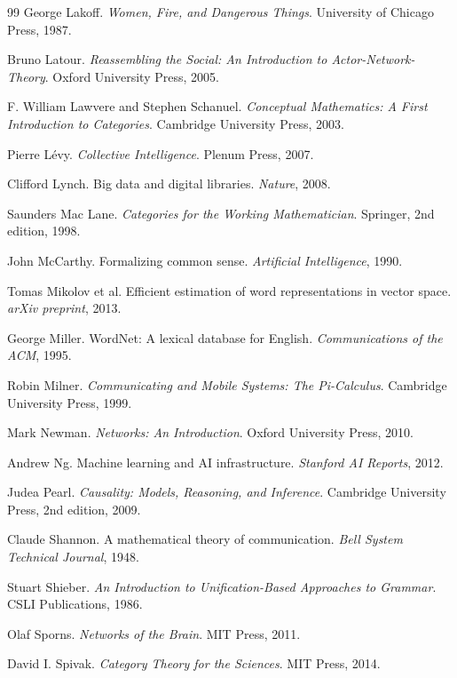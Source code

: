 \documentclass[12pt,a4paper]{article}
\begin{document}
\begin{thebibliography}{99}
George Lakoff.
\textit{Women, Fire, and Dangerous Things}.
University of Chicago Press, 1987.

Bruno Latour.
\textit{Reassembling the Social: An Introduction to Actor-Network-Theory}.
Oxford University Press, 2005.

F. William Lawvere and Stephen Schanuel.
\textit{Conceptual Mathematics: A First Introduction to Categories}.
Cambridge University Press, 2003.

Pierre Lévy.
\textit{Collective Intelligence}.
Plenum Press, 2007.

Clifford Lynch.
Big data and digital libraries.
\textit{Nature}, 2008.

Saunders Mac Lane.
\textit{Categories for the Working Mathematician}.
Springer, 2nd edition, 1998.

John McCarthy.
Formalizing common sense.
\textit{Artificial Intelligence}, 1990.

Tomas Mikolov et al.
Efficient estimation of word representations in vector space.
\textit{arXiv preprint}, 2013.

George Miller.
WordNet: A lexical database for English.
\textit{Communications of the ACM}, 1995.

Robin Milner.
\textit{Communicating and Mobile Systems: The Pi-Calculus}.
Cambridge University Press, 1999.

Mark Newman.
\textit{Networks: An Introduction}.
Oxford University Press, 2010.

Andrew Ng.
Machine learning and AI infrastructure.
\textit{Stanford AI Reports}, 2012.

Judea Pearl.
\textit{Causality: Models, Reasoning, and Inference}.
Cambridge University Press, 2nd edition, 2009.

Claude Shannon.
A mathematical theory of communication.
\textit{Bell System Technical Journal}, 1948.

Stuart Shieber.
\textit{An Introduction to Unification-Based Approaches to Grammar}.
CSLI Publications, 1986.

Olaf Sporns.
\textit{Networks of the Brain}.
MIT Press, 2011.

David I. Spivak.
\textit{Category Theory for the Sciences}.
MIT Press, 2014.


\end{thebibliography}
\end{document}
